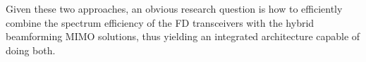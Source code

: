 \documentclass[onecolumn,draftcls,journal]{IEEEtran}
\begin{document}
%

Given these two approaches, an obvious research question is how to efficiently  combine the spectrum efficiency of the FD transceivers with the hybrid beamforming MIMO solutions, thus yielding an integrated architecture capable of doing both.
\IEEEpubidadjcol
\vspace{-.2in}
\end{document}
